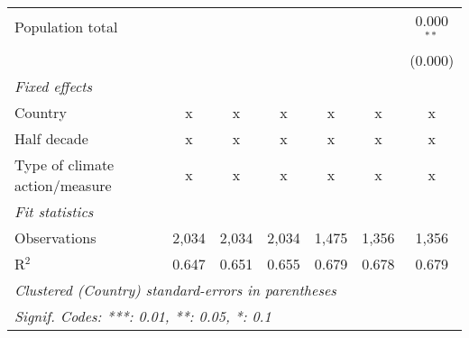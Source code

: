 \begin{tabular}{lcccccc}
   Population total                                               &         &                &                &                &                & 0.000$^{**}$\\   
                                                                  &         &                &                &                &                & (0.000)\\   
   \emph{Fixed effects}\\
   Country                                                        & x       & x              & x              & x              & x              & x\\  
   Half decade                                                    & x       & x              & x              & x              & x              & x\\  
   Type of climate action/measure                                 & x       & x              & x              & x              & x              & x\\  
   \midrule \emph{Fit statistics}\\
   Observations                                                   & 2,034   & 2,034          & 2,034          & 1,475          & 1,356          & 1,356\\  
   R$^2$                                                          & 0.647   & 0.651          & 0.655          & 0.679          & 0.678          & 0.679\\  
   \midrule
   \multicolumn{7}{l}{\emph{Clustered (Country) standard-errors in parentheses}}\\
   \multicolumn{7}{l}{\emph{Signif. Codes: ***: 0.01, **: 0.05, *: 0.1}}\\
\end{tabular}
\par\endgroup


